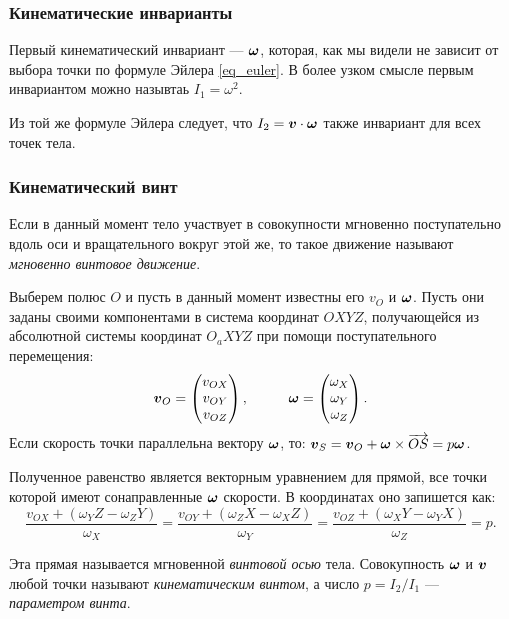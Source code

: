 \subsubsection*{Кинематические инварианты}
\begin{to_def}
	Первый кинематический инвариант --- $\mbox{\boldmath $\omega$}$, которая, как мы видели не зависит от выбора точки по формуле Эйлера \eqref{eq_euler}.	
	В более узком смысле первым инвариантом можно назывтаь $I_1 = \omega^2 $.
\end{to_def}
\begin{to_def}
	Из той же формуле Эйлера следует, что $I_2 = \mbox{\boldmath $v$} \cdot \mbox{\boldmath $\omega$}$ также инвариант для всех точек тела.
\end{to_def}

\subsubsection*{Кинематический винт}
\begin{to_def}
	Если в данный момент тело участвует в совокупности мгновенно поступательно вдоль оси и вращательного вокруг этой же, то такое движение называют \textit{мгновенно винтовое движение}.
\end{to_def}
Выберем полюс $O$ и пусть в данный момент известны его $v_O$ и $\mbox{\boldmath $\omega$}$. Пусть они заданы своими компонентами в система координат $O X Y Z$, получающейся из абсолютной системы координат $O_a X Y Z$ при помощи поступательного перемещения:
\begin{equation*}
	\mbox{\boldmath $v$}_O = \begin{pmatrix}
		v_{O X} \\ v_{O Y} \\ v_{O Z}
	\end{pmatrix},
	\hspace*{1 cm}
	\mbox{\boldmath $\omega$} = \begin{pmatrix}
		\omega_X \\ \omega_Y \\ \omega_Z
	\end{pmatrix}.
\end{equation*}
Если скорость точки параллельна вектору $\mbox{\boldmath $\omega$}$, то: $\mbox{\boldmath $v$}_S = \mbox{\boldmath $v$}_O + \mbox{\boldmath $\omega$} \times \overrightarrow{O S} = p \mbox{\boldmath $\omega$}$.

Полученное равенство является векторным уравнением для прямой, все точки которой имеют сонаправленные $\mbox{\boldmath $\omega$}$ скорости. В координатах оно запишется как:
\begin{equation*}
	\frac{v_{O X} + (\omega_Y Z - \omega_Z Y)}{\omega_X} = \frac{v_{O Y} + (\omega_Z X - \omega_X Z)}{\omega_Y} = \frac{v_{O Z} + (\omega_X Y - \omega_Y X)}{\omega_Z} = p.
\end{equation*}
\begin{to_def}
	Эта прямая называется мгновенной \textit{винтовой осью} тела. Совокупность $\mbox{\boldmath $\omega$}$ и $\mbox{\boldmath $v$}$ любой точки называют \textit{кинематическим винтом}, а число $p = I_2/I_1$ --- \textit{параметром винта}.	
\end{to_def}

